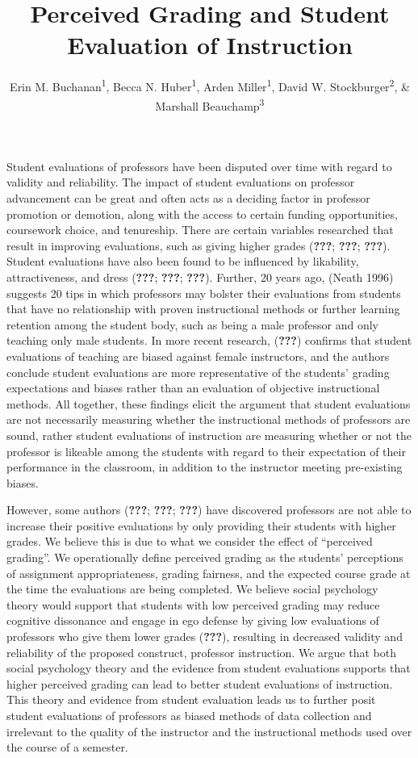 \documentclass[man]{apa6}
\title{Perceived Grading and Student Evaluation of Instruction}
\author{Erin M. Buchanan\textsuperscript{1}, Becca N. Huber\textsuperscript{1}, Arden Miller\textsuperscript{1}, David W. Stockburger\textsuperscript{2}, \& Marshall Beauchamp\textsuperscript{3}}
\affiliation{
    \vspace{0.5cm}
          \textsuperscript{1} Missouri State University\\
          \textsuperscript{2} US Air Force Academy\\
          \textsuperscript{3} University of Missouri - Kansas City  }
\theoremstyle{definition}
\theoremstyle{definition}
\theoremstyle{definition}
\theoremstyle{remark}
\begin{document}
\maketitle

\setcounter{secnumdepth}{0}



Student evaluations of professors have been disputed over time with
regard to validity and reliability. The impact of student evaluations on
professor advancement can be great and often acts as a deciding factor
in professor promotion or demotion, along with the access to certain
funding opportunities, coursework choice, and tenureship. There are
certain variables researched that result in improving evaluations, such
as giving higher grades ({\textbf{???}}; {\textbf{???}};
{\textbf{???}}). Student evaluations have also been found to be
influenced by likability, attractiveness, and dress ({\textbf{???}};
{\textbf{???}}; {\textbf{???}}). Further, 20 years ago, (Neath 1996)
suggests 20 tips in which professors may bolster their evaluations from
students that have no relationship with proven instructional methods or
further learning retention among the student body, such as being a male
professor and only teaching only male students. In more recent research,
({\textbf{???}}) confirms that student evaluations of teaching are
biased against female instructors, and the authors conclude student
evaluations are more representative of the students' grading
expectations and biases rather than an evaluation of objective
instructional methods. All together, these findings elicit the argument
that student evaluations are not necessarily measuring whether the
instructional methods of professors are sound, rather student
evaluations of instruction are measuring whether or not the professor is
likeable among the students with regard to their expectation of their
performance in the classroom, in addition to the instructor meeting
pre-existing biases.

However, some authors ({\textbf{???}}; {\textbf{???}}; {\textbf{???}})
have discovered professors are not able to increase their positive
evaluations by only providing their students with higher grades. We
believe this is due to what we consider the effect of \enquote{perceived
grading}. We operationally define perceived grading as the students'
perceptions of assignment appropriateness, grading fairness, and the
expected course grade at the time the evaluations are being completed.
We believe social psychology theory would support that students with low
perceived grading may reduce cognitive dissonance and engage in ego
defense by giving low evaluations of professors who give them lower
grades ({\textbf{???}}), resulting in decreased validity and reliability
of the proposed construct, professor instruction. We argue that both
social psychology theory and the evidence from student evaluations
supports that higher perceived grading can lead to better student
evaluations of instruction. This theory and evidence from student
evaluation leads us to further posit student evaluations of professors
as biased methods of data collection and irrelevant to the quality of
the instructor and the instructional methods used over the course of a
semester.
\end{document}
